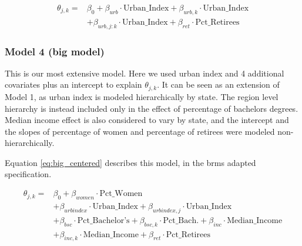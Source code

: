 \documentclass[12pt]{article}
\begin{document}
\begin{equation} \label{eq:nested_centered}
	\begin{aligned}
		\theta_{j,k} =    &\beta_0 + \beta_{urb} \cdot \text{Urban\_Index} + \beta_{urb,k} \cdot \text{Urban\_Index} \\
		&+ \beta_{urb,j:k} \cdot \text{Urban\_Index} + \beta_{ret} \cdot \text{Pct\_Retirees}
	\end{aligned}
\end{equation}



\subsubsection*{Model 4 (big model)}


This is our most extensive model.
Here we used urban index and 4 additional covariates plus an intercept to explain $\theta_{j,k}$.
It can be seen as an extension of Model 1, as urban index is modeled hierarchically by state. The region level hierarchy is instead included only in the effect of percentage of bachelors degrees.
Median income effect is also considered to vary by state, and the intercept and the slopes of percentage of women and percentage of retirees were modeled non-hierarchically.

Equation \ref{eq:big_centered} describes this model, in the brms adapted specification.

\begin{equation} \label{eq:big_centered}
	\begin{aligned}
		\theta_{j,k} = & \beta_0 + \beta_{women} \cdot \text{Pct\_Women}                                                                              \\
		& + \beta_{urbindex} \cdot \text{Urban\_Index} + \beta_{urbindex, j} \cdot \text{Urban\_Index}                                 \\
		& + \beta_{bsc} \cdot \text{Pct\_Bachelor's} + \beta_{bsc,k} \cdot \text{Pct\_Bach.} + \beta_{inc} \cdot \text{Median\_Income} \\
		& + \beta_{inc,k} \cdot \text{Median\_Income} + \beta_{ret} \cdot \text{Pct\_Retirees}
	\end{aligned}
\end{equation}
\end{document}
